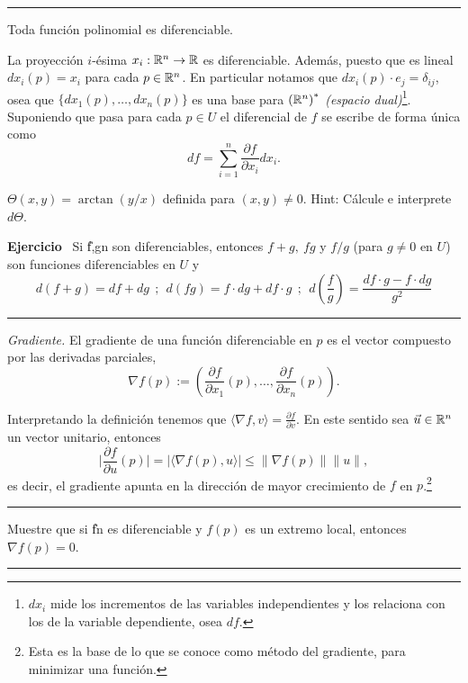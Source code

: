 \vspace{0.2in} 

\hrule 
\begin{example}
    Toda función polinomial es diferenciable. 
\end{example}
\begin{example}
    La proyección $i$-ésima \(x_i: \mathbb{R}^n\rightarrow \mathbb{R}\) es diferenciable. Además, puesto que es lineal \(dx_i(p) = x_i \) para cada \(p\in \mathbb{R}^n\). En particular notamos que \(dx_i(p)\cdot e_j = \delta_{ij}\), osea que \(\{dx_1(p), \ldots,dx_n(p)\}\) es una base para \({(\mathbb{R}^n)}^*\) \emph{(espacio dual)}\footnote{\(dx_i\) mide los incrementos de las variables independientes y los relaciona con los de la variable dependiente, osea \(df\).}. Suponiendo que pasa para cada \(p\in U\) el diferencial de \(f\) se escribe de forma única como 
    \[df = \sum_{i=1}^n \frac{\partial f }{\partial x_i} dx_i. \]
\end{example}
\begin{example}
    \(\Theta(x,y) = \arctan (y/x) \) definida para \((x,y)\neq 0\). Hint: Cálcule e interprete \(d\Theta\). 
\end{example}
\begin{proposition}
    \textbf{Ejercicio} \ Si \U{f,g}{n}{} son diferenciables, entonces \(f+g,\ fg\) y \(f/g\) (para \(g\neq 0\) en \(U\)) son funciones diferenciables en \(U\) y 
    \[d(f+g) = df + dg\ \ ;\ \ d(fg) = f\cdot dg + df\cdot g\ \ ; \ \ d\left(\frac{f}{g}\right) = \frac{df\cdot g - f\cdot dg}{g^2}\] 
\end{proposition}
\hrule 

\vspace{0.2in}

\begin{definition}
    \textit{Gradiente.} El gradiente de una función diferenciable en \(p\) es el vector compuesto por las derivadas parciales,
    \[\nabla f(p) := \left(\frac{\partial f}{\partial x_1}(p),\ldots,\frac{\partial f}{\partial x_n}(p)\right). \]
\end{definition}

\begin{note}
    Interpretando la definición tenemos que \(\langle \nabla f , v\rangle = \frac{\partial f }{\partial v}\). En este sentido sea \(\vec{u}\in \mathbb{R}^n\) un vector unitario, entonces 
    \[\Big|\frac{\partial f}{\partial u}(p)\Big| = |\langle \nabla f (p), u\rangle| \leq \|\nabla f(p)\|\|u\|,\]
    es decir, el gradiente apunta en la dirección de mayor crecimiento de \(f\) en \(p\).\footnote{Esta es la base de lo que se conoce como método del gradiente, para minimizar una función.} 
\end{note}

\vspace{0.2in}

\hrule 
\begin{exercise}
    Muestre que si \U{f}{n}{} es diferenciable y \(f(p)\) es un extremo local, entonces \(\nabla f (p) = 0\).  
\end{exercise}
\hrule 

\vspace{0.2in}
